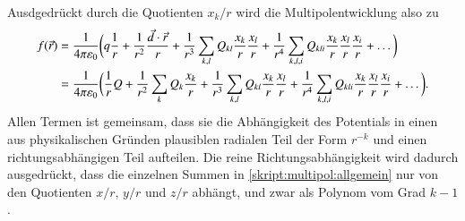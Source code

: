 Ausdgedrückt durch die Quotienten $x_k/r$ wird die Multipolentwicklung
also zu
\begin{align}
f(\vec r)
&=
\frac{1}{4\pi\varepsilon_0}
\biggl(
q
\frac{1}{r}
+
\frac{1}{r^2} \frac{\vec{d}\cdot\vec{r}}{r}
+
\frac{1}{r^3} \sum_{k,l}Q_{kl}\frac{x_k}{r}\frac{x_l}{r}
+
\frac{1}{r^4} \sum_{k,l,i}Q_{kli}\frac{x_k}{r}\frac{x_l}{r}\frac{x_i}{r}
+
\dots
\biggr)
\notag
\\
&=
\frac{1}{4\pi\varepsilon_0}
\biggl(
\frac{1}{r} Q
+
\frac{1}{r^2} \sum_{k}Q_k \frac{x_k}{r}
+
\frac{1}{r^3} \sum_{k,l}Q_{kl}\frac{x_k}{r}\frac{x_l}{r}
+
\frac{1}{r^4} \sum_{k,l,i}Q_{kli}\frac{x_k}{r}\frac{x_l}{r}\frac{x_i}{r}
+
\dots
\biggr).
\label{skript:multipol:allgemein}
\end{align}
Allen Termen ist gemeinsam, dass sie die Abhängigkeit des Potentials in einen
aus physikalischen Gründen plausiblen radialen Teil der Form $r^{-k}$
und einen richtungsabhängigen Teil aufteilen.
Die reine Richtungsabhängigkeit wird dadurch ausgedrückt, dass
die einzelnen Summen in \eqref{skript:multipol:allgemein}
nur von den Quotienten $x/r$, $y/r$ und $z/r$ abhängt, und zwar
als Polynom vom Grad $k-1$.



